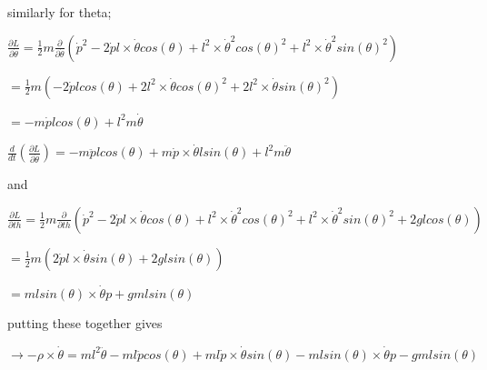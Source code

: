 \documentclass[12pt]{article}
\begin{document}
similarly for theta;


\vspace{\baselineskip}

$\frac{\partial L}{\partial \dot{\theta}} = \frac{1}{2} m \frac{\partial}{\partial \dot{\theta}} (\dot{p}^2 - 2 \dot{p} l \times \dot{\theta} cos(\theta) + l^2 \times \dot{\theta}^2 cos(\theta)^2 + l^2 \times \dot{\theta}^2 sin(\theta)^2)$


\vspace{\baselineskip}


$ = \frac{1}{2} m(-2 \dot{p} l cos(\theta) + 2 l^2 \times \dot{\theta} cos(\theta)^2 + 2 l^2 \times \dot{\theta} sin(\theta)^2)$


\vspace{\baselineskip}


$= -m \dot{p} l cos(\theta) + l^2 m \dot{\theta}$


\vspace{\baselineskip}


$\frac{d}{dt}(\frac{\partial L}{\partial \dot{\theta}}) = -m \ddot{p} l cos(\theta) + m \dot{p} \times \dot{\theta} l sin(\theta) + l^2 m \ddot{\theta}$


\vspace{\baselineskip}


and
\vspace{\baselineskip}


$\frac{\partial L}{\partial th} = \frac{1}{2} m \frac{\partial}{\partial th} ( \dot{p}^2 - 2 \dot{p} l \times \dot{\theta} cos(\theta) + l^2 \times \dot{\theta}^2 cos(\theta)^2 +  l^2 \times \dot{\theta}^2 sin(\theta)^2 + 2 g l cos(\theta))$


\vspace{\baselineskip}


$= \frac{1}{2} m (2 \dot{p} l \times \dot{\theta} sin(\theta) + 2 g l sin(\theta))$


\vspace{\baselineskip}


$= m l sin(\theta) \times \dot{\theta} p + g m l sin(\theta)$


\vspace{\baselineskip}


putting these together gives


\vspace{\baselineskip}


$\rightarrow -\rho \times \dot{\theta} = m l^2 \ddot{\theta} - m l \ddot{p} cos(\theta) + m l \dot{p} \times \dot{\theta} sin(\theta)  - m l sin(\theta) \times \dot{\theta} p - g m l sin(\theta)$
\end{document}
